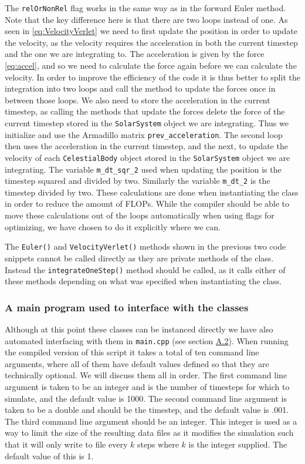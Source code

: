 \documentclass[reprint,english,notitlepage]{revtex4-1}  %
\begin{document}
The \verb+relOrNonRel+ flag works in the same way as in the forward Euler method. Note that the key difference here is that there are two loops instead of one. As seen in \eqref{eq:VelocityVerlet} we need to first update the position in order to update the velocity, as the velocity requires the acceleration in both the current timestep and the one we are integrating to. The acceleration is given by the force \eqref{eq:accel}, and so we need to calculate the force again before we can calculate the velocity. In order to improve the efficiency of the code it is thus better to split the integration into two loops and call the method to update the forces once in between those loops. We also need to store the acceleration in the current timestep, as calling the methods that update the forces delete the force of the current timestep stored in the \verb+SolarSystem+ object we are integrating. Thus we initialize and use the Armadillo \citep{Armadillo} matrix \verb+prev_acceleration+. The second loop then uses the acceleration in the current timestep, and the next, to update the velocity of each \verb+CelestialBody+ object stored in the \verb+SolarSystem+ object we are integrating. The variable \verb+m_dt_sqr_2+ used when updating the position is the timestep squared and divided by two. Similarly the variable \verb+m_dt_2+ is the timestep divided by two. These calculations are done when instantiating the class in order to reduce the amount of FLOPs. While the compiler should be able to move these calculations out of the loops automatically when using flags for optimizing, we have chosen to do it explicitly where we can.

The \verb+Euler()+ and \verb+VelocityVerlet()+ methods shown in the previous two code snippets cannot be called directly as they are private methods of the class. Instead the \verb+integrateOneStep()+ method should be called, as it calls either of these methods depending on what was specified when instantiating the class.


\subsubsection{A main program used to interface with the classes} \label{sec:III:a:4}

Although at this point these classes can be instanced directly we have also automated interfacing with them in \verb+main.cpp+ (see section \hyperref[A.2]{A.2}). When running the compiled version of this script it takes a total of ten command line arguments, where all of them have default values defined so that they are technically optional. We will discuss them all in order. The first command line argument is taken to be an integer and is the number of timesteps for which to simulate, and the default value is 1000. The second command line argument is taken to be a double and should be the timestep, and the default value is .001. The third command line argument should be an integer. This integer is used as a way to limit the size of the resulting data files as it modifies the simulation such that it will only write to file every $k$ steps where $k$ is the integer supplied. The default value of this is 1. 
\end{document}
